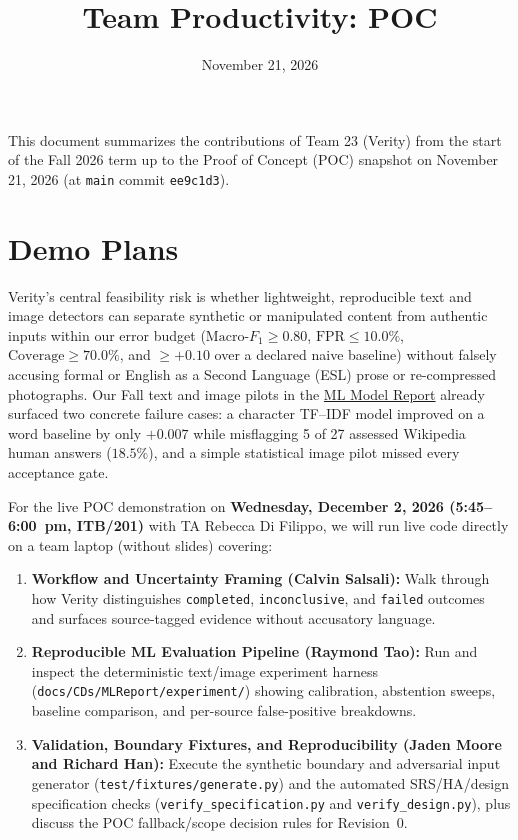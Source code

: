 \documentclass{article}
\title{Team Productivity: POC\\\progname}
\author{\authname}
\date{November 21, 2026}
\begin{document}
\maketitle

This document summarizes the contributions of Team 23 (Verity) from the start of the Fall 2026 term up to the Proof of Concept (POC) snapshot on November 21, 2026 (at \texttt{main} commit \texttt{ee9c1d3}).

\section{Demo Plans}

Verity's central feasibility risk is whether lightweight, reproducible text and image detectors can separate synthetic or manipulated content from authentic inputs within our error budget ($\text{Macro-}F_1 \ge 0.80$, $\text{FPR} \le 10.0\%$, $\text{Coverage} \ge 70.0\%$, and $\ge +0.10$ over a declared naive baseline) without falsely accusing formal or English as a Second Language (ESL) prose or re-compressed photographs. Our Fall text and image pilots in the \href{https://github.com/richy1337/Verity/blob/main/pdfs/CDs/MLReport/main.pdf}{ML Model Report} already surfaced two concrete failure cases: a character TF--IDF model improved on a word baseline by only $+0.007$ while misflagging 5 of 27 assessed Wikipedia human answers ($18.5\%$), and a simple statistical image pilot missed every acceptance gate.

For the live POC demonstration on \textbf{Wednesday, December 2, 2026 (5:45--6:00~pm, ITB/201)} with TA Rebecca Di Filippo, we will run live code directly on a team laptop (without slides) covering:
\begin{enumerate}
    \item \textbf{Workflow and Uncertainty Framing (Calvin Salsali):} Walk through how Verity distinguishes \texttt{completed}, \texttt{inconclusive}, and \texttt{failed} outcomes and surfaces source-tagged evidence without accusatory language.
    \item \textbf{Reproducible ML Evaluation Pipeline (Raymond Tao):} Run and inspect the deterministic text/image experiment harness (\texttt{docs/\allowbreak{}CDs/\allowbreak{}MLReport/\allowbreak{}experiment/}) showing calibration, abstention sweeps, baseline comparison, and per-source false-positive breakdowns.
    \item \textbf{Validation, Boundary Fixtures, and Reproducibility (Jaden Moore and Richard Han):} Execute the synthetic boundary and adversarial input generator (\texttt{test/\allowbreak{}fixtures/\allowbreak{}generate.py}) and the automated SRS/HA/design specification checks (\texttt{verify\_\allowbreak{}specification.py} and \texttt{verify\_\allowbreak{}design.py}), plus discuss the POC fallback/scope decision rules for Revision~0.
\end{enumerate}
\end{document}
